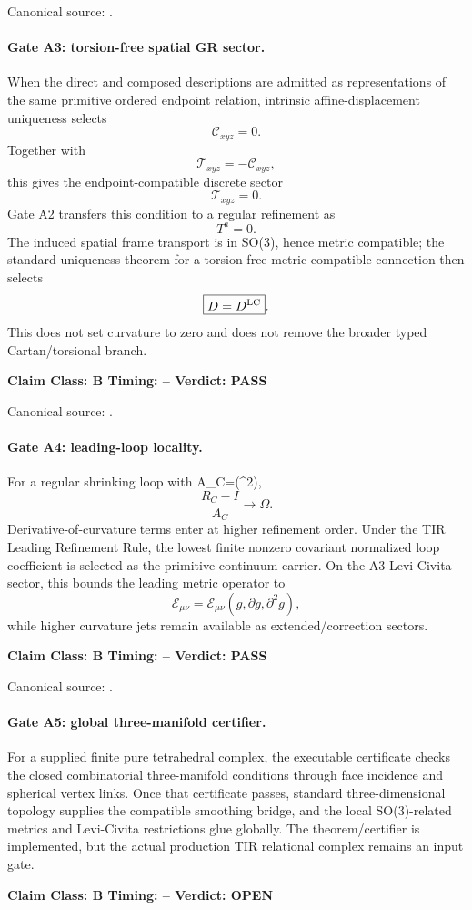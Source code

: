 \documentclass[11pt,a4paper,twoside]{book}
\def\({}%
\def\){}%
\theoremstyle{definition}
\newcommand{\vTwelveStatus}[3]{\par\noindent\textbf{Claim Class: #1 \quad Timing: #2 \quad Verdict: #3}\par}
\begin{document}
Canonical source:
.

\paragraph{Gate A3: torsion-free spatial GR sector.}
When the direct and composed descriptions are admitted as representations of
the same primitive ordered endpoint relation, intrinsic affine-displacement
uniqueness selects
\[
\mathcal C_{xyz}=0.
\]
Together with
\[
\mathcal T_{xyz}=-\mathcal C_{xyz},
\]
this gives the endpoint-compatible discrete sector
\[
\mathcal T_{xyz}=0.
\]
Gate A2 transfers this condition to a regular refinement as
\[
\boxed{T^a=0}.
\]
The induced spatial frame transport is in \(SO(3)\), hence metric compatible;
the standard uniqueness theorem for a torsion-free metric-compatible
connection then selects
\[
\boxed{D=D^{\rm LC}}.
\]
This does not set curvature to zero and does not remove the broader typed
Cartan/torsional branch.
\vTwelveStatus{B}{--}{PASS}

Canonical source:
.

\paragraph{Gate A4: leading-loop locality.}
For a regular shrinking loop with \(A_C=\Theta(\epsilon^2)\),
\[
\frac{R_C-I}{A_C}\longrightarrow\Omega.
\]
Derivative-of-curvature terms enter at higher refinement order.  Under the TIR
Leading Refinement Rule, the lowest finite nonzero covariant normalized loop
coefficient is selected as the primitive continuum carrier.  On the A3
Levi-Civita sector, this bounds the leading metric operator to
\[
\mathcal E_{\mu\nu}
=\mathcal E_{\mu\nu}(g,\partial g,\partial^2g),
\]
while higher curvature jets remain available as extended/correction sectors.
\vTwelveStatus{B}{--}{PASS}

Canonical source:
.

\paragraph{Gate A5: global three-manifold certifier.}
For a supplied finite pure tetrahedral complex, the executable certificate
checks the closed combinatorial three-manifold conditions through face
incidence and spherical vertex links.  Once that certificate passes, standard
three-dimensional topology supplies the compatible smoothing bridge, and the
local \(SO(3)\)-related metrics and Levi-Civita restrictions glue globally.
The theorem/certifier is implemented, but the actual production TIR relational
complex remains an input gate.
\vTwelveStatus{B}{--}{OPEN}
\end{document}
